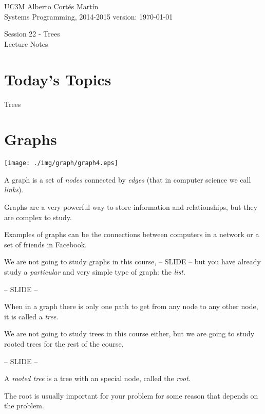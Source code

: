 \documentclass[a4paper, 9pt]{extarticle}
\newcommand{\realtitle}{Session 22 - Trees}
\begin{document}
\makebox[\linewidth]{\rule{\textwidth}{0.4pt}}
UC3M \hfill Alberto Cortés Martín\\
Systems Programming, 2014-2015 \hfill version: \today\\
\makebox[\linewidth]{\rule{\textwidth}{0.4pt}}
\begin{center}
  \Large{\realtitle}\\Lecture Notes
\end{center}
\makebox[\linewidth]{\rule{\textwidth}{0.4pt}}
\vspace{1cm}


\section{Today's Topics}
\begin{blackboard}
Trees
\end{blackboard}

\section{Graphs}

\begin{center}
\texttt{[image: ./img/graph/graph4.eps]}
\end{center}

A graph is a set of \emph{nodes} connected by \emph{edges} (that in computer science we call \emph{links}).

Graphs are a very powerful way to store information and relationships,
but they are complex to study.

Examples of graphs can be the connections between computers in a network or a set of friends in Facebook.

We are not going to study graphs in this course,
-- SLIDE --
but you have already study a \emph{particular} and very simple type of graph: the \emph{list}.

-- SLIDE --

When in a graph there is only one path to get from any node to any other node, it is called a \emph{tree}.

We are not going to study trees in this course either,
but we are going to study rooted trees for the rest of the course.

-- SLIDE --

A \emph{rooted tree} is a tree with an special node, called the \emph{root}.

The root is usually important for your problem for some reason that depends on the problem.
\end{document}
